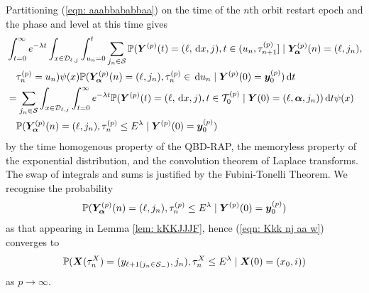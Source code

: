 Partitioning (\ref{eqn: aaabbababbaa}) on the time of the \(n\)th orbit restart epoch and the phase and level at this time gives
\begin{align}
	&\int_{t=0}^\infty e^{-\lambda t} 
	\int_{x\in\mathcal{D}_{\ell,j}}
	\int_{u_n=0}^t\sum_{j_n\in\mathcal S} \mathbb P({\boldsymbol Y}^{(p)}(t) = (\ell,\, \mathrm{d} x,j), 
	t \in(u_n, \tau_{n+1}^{(p)}] \mid\bm{Y}_{\bm{\alpha}}^{(p)}(n) = (\ell,j_n), \nonumber 
	\\&\quad \tau_{n}^{(p)}= u_n)\psi(x) \mathbb P(\bm{Y}_{\bm{\alpha}}^{(p)}(n) = (\ell, j_n), \tau_{n}^{(p)}\in \, \mathrm{d} u_n 
	 \mid \boldsymbol Y^{(p)}(0)=\boldsymbol y_0^{(p)}) 
	  \, \mathrm{d} t \nonumber 
	 \\&= \sum_{j_n\in\mathcal S}
	\int_{x\in\mathcal{D}_{\ell,j}} \int_{t=0}^\infty e^{-\lambda t} \mathbb P({\boldsymbol Y}^{(p)}(t) = (\ell,\, \mathrm{d} x, j), 
	t\in\mathcal T_{0}^{(p)} \mid\nonumber 
	  \boldsymbol Y(0) = (\ell,\boldsymbol\alpha,j_n))\, \mathrm{d} t \psi(x)  
	  \\&\quad{} \mathbb P(\bm{Y}_{\bm{\alpha}}^{(p)}(n) = (\ell,j_n), \tau_{n}^{(p)}\leq E^\lambda 
	 \mid \boldsymbol Y^{(p)}(0)=\boldsymbol y_0^{(p)}) \label{eqn: l whkrqvlkjbrd}
\end{align}
by the time homogenous property of the QBD-RAP, the memoryless property of the exponential distribution, and the convolution theorem of Laplace transforms. The swap of integrals and sums is justified by the Fubini-Tonelli Theorem. We recognise the probability 
\begin{align}
	\mathbb P(\bm{Y}_{\bm{\alpha}}^{(p)}(n) = (\ell, j_n), \tau_{n}^{(p)}\leq E^\lambda 
	 \mid \boldsymbol Y^{(p)}(0)=\boldsymbol y_0^{(p)}) \label{eqn: Kkk nj aa w}
\end{align}
as that appearing in Lemma \ref{lem: kKKJJJF}, hence (\ref{eqn: Kkk nj aa w}) converges to 
\begin{align}
	\mathbb P(\boldsymbol X(\tau_n^X) = (y_{\ell+1(j_{n}\in\mathcal S_-)}, 
		j_n), \tau_{n}^X\leq E^\lambda
		\mid \boldsymbol X(0)=(x_0, i)) \label{eqn: ashverkjbvjhkhdsknacva}
\end{align}
as \(p\to\infty\). 

